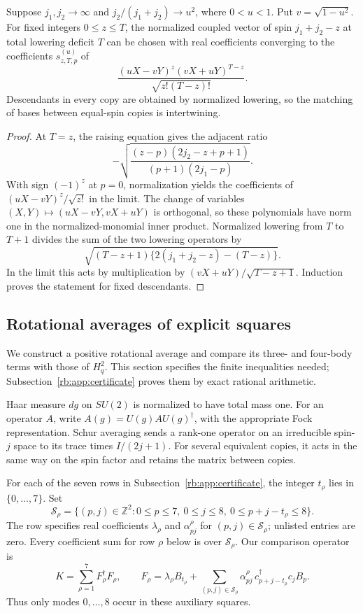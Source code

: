 \begin{lemma}\label{rb:lem:coupling}
Suppose $j_1,j_2\to\infty$ and $j_2/(j_1+j_2)\to u^2$, where $0<u<1$. Put $v=\sqrt{1-u^2}$. For fixed integers $0\le z\le T$, the normalized coupled vector of spin $j_1+j_2-z$ at total lowering deficit $T$ can be chosen with real coefficients converging to the coefficients $s^{(u)}_{z,T,p}$ of
\begin{equation}\label{rb:eq:coupling}
 \frac{(uX-vY)^z(vX+uY)^{T-z}}{\sqrt{z!(T-z)!}}.
\end{equation}
Descendants in every copy are obtained by normalized lowering, so the matching of bases between equal-spin copies is intertwining.
\end{lemma}
\begin{proof}
At $T=z$, the raising equation gives the adjacent ratio
\[
 -\sqrt{\frac{(z-p)(2j_2-z+p+1)}{(p+1)(2j_1-p)}}.
\]
With sign $(-1)^z$ at $p=0$, normalization yields the coefficients of $(uX-vY)^z/\sqrt{z!}$ in the limit. The change of variables $(X,Y)\mapsto(uX-vY,vX+uY)$ is orthogonal, so these polynomials have norm one in the normalized-monomial inner product. Normalized lowering from $T$ to $T+1$ divides the sum of the two lowering operators by
\[
 \sqrt{(T-z+1)\{2(j_1+j_2-z)-(T-z)\}}.
\]
In the limit this acts by multiplication by $(vX+uY)/\sqrt{T-z+1}$. Induction proves the statement for fixed descendants.
\end{proof}

\subsection{Rotational averages of explicit squares}
\label{rb:sec:squares}
We construct a positive rotational average and compare its three- and four-body terms with those of $H_q^2$. This section specifies the finite inequalities needed; Subsection~\ref{rb:app:certificate} proves them by exact rational arithmetic.

Haar measure $dg$ on $SU(2)$ is normalized to have total mass one. For an operator $A$, write $A(g)=U(g)AU(g)^\dagger$, with the appropriate Fock representation. Schur averaging sends a rank-one operator on an irreducible spin-$j$ space to its trace times $I/(2j+1)$. For several equivalent copies, it acts in the same way on the spin factor and retains the matrix between copies.

For each of the seven rows in Subsection~\ref{rb:app:certificate}, the integer
$t_\rho$ lies in $\{0,\ldots,7\}$. Set
\[
 \mathcal S_\rho=\{(p,j)\in\mathbb Z^2:0\le p\le7,\ 0\le j\le8,\
                         0\le p+j-t_\rho\le8\}.
\]
The row specifies real coefficients $\lambda_\rho$ and
$\alpha^\rho_{pj}$ for $(p,j)\in\mathcal S_\rho$; unlisted entries are zero.
Every coefficient sum for row $\rho$ below is over $\mathcal S_\rho$.
Our comparison operator is
\begin{equation}\label{rb:eq:F}
 K=\sum_{\rho=1}^7F_\rho^\dagger F_\rho,\qquad
 F_\rho=\lambda_\rho B_{t_\rho}
       +\sum_{(p,j)\in\mathcal S_\rho}\alpha^{\rho}_{pj}\,
                                  c_{p+j-t_\rho}^\dagger c_jB_p.
\end{equation}
Thus only modes $0,\ldots,8$ occur in these auxiliary squares.

